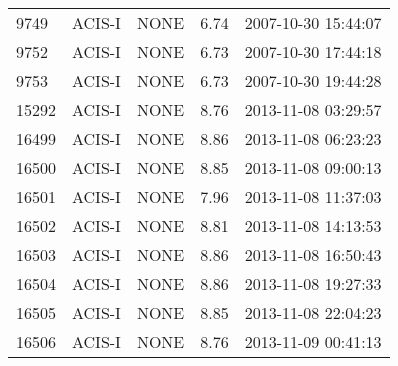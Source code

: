 \begin{table*}
\begin{center}
\begin{tabular}{lllll}
9749	& ACIS-I & NONE	& 6.74	& 2007-10-30 15:44:07 \\
9752	& ACIS-I & NONE	& 6.73	& 2007-10-30 17:44:18 \\
9753	& ACIS-I & NONE	& 6.73	& 2007-10-30 19:44:28 \\
15292	& ACIS-I & NONE	& 8.76	& 2013-11-08 03:29:57 \\
16499	& ACIS-I & NONE	& 8.86	& 2013-11-08 06:23:23 \\
16500	& ACIS-I & NONE	& 8.85	& 2013-11-08 09:00:13 \\
16501	& ACIS-I & NONE	& 7.96	& 2013-11-08 11:37:03 \\
16502	& ACIS-I & NONE	& 8.81	& 2013-11-08 14:13:53 \\
16503	& ACIS-I & NONE	& 8.86	& 2013-11-08 16:50:43 \\
16504	& ACIS-I & NONE	& 8.86	& 2013-11-08 19:27:33 \\
16505	& ACIS-I & NONE	& 8.85	& 2013-11-08 22:04:23 \\
16506	& ACIS-I & NONE	& 8.76	& 2013-11-09 00:41:13 \\
\hline
\end{tabular}
\end{center}
\end{table*}
